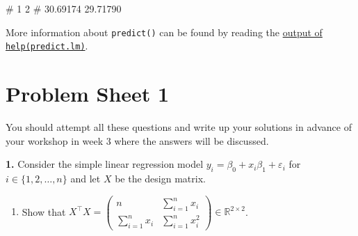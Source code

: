 \documentclass[
  a4paper,
]{article}
\newenvironment{Shaded}{\begin{snugshade}}{\end{snugshade}}
\newcommand{\NormalTok}[1]{#1}
\providecommand{\tightlist}{%
  \setlength{\itemsep}{0pt}\setlength{\parskip}{0pt}}
\theoremstyle{definition}
\theoremstyle{definition}
\theoremstyle{definition}
\theoremstyle{definition}
\theoremstyle{remark}
\begin{document}
\begin{Shaded}
\begin{Highlighting}[]
\NormalTok{\#        1        2 }
\NormalTok{\# 30.69174 29.71790}
\end{Highlighting}
\end{Shaded}

More information about \texttt{predict()} can be found by reading
the \href{https://rdrr.io/r/stats/predict.html}{output of \texttt{help(predict.lm)}}.

\clearpage

\hypertarget{P01}{%
\section*{Problem Sheet 1}\label{P01}}

You should attempt all these questions and write up your solutions in advance
of your workshop in week 3 where the answers will be discussed.

\textbf{1.} Consider the simple linear regression model
\(y_i = \beta_0 + x_{i} \beta_1 + \varepsilon_i\) for
\(i \in \{1, 2, \ldots, n\}\) and let \(X\) be the design matrix.

\begin{enumerate}
\def\labelenumi{\alph{enumi}.}
\tightlist
\item
  Show that \(\displaystyle X^\top X = \begin{pmatrix}  n & \sum_{i=1}^n x_i \\  \sum_{i=1}^n x_i & \sum_{i=1}^n x_i^2  \end{pmatrix} \in \mathbb{R}^{2\times 2}\).
\end{enumerate}
\end{document}
